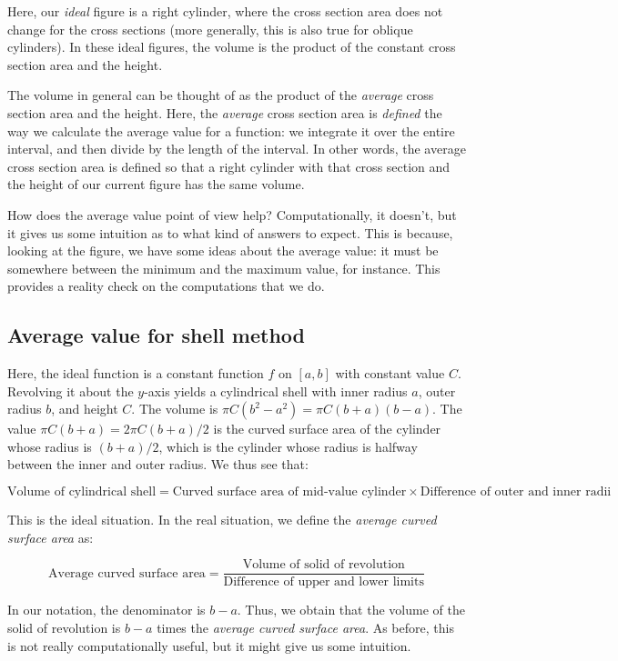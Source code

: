 \documentclass[10pt]{amsart}
\begin{document}
Here, our {\em ideal} figure is a right cylinder, where the cross
section area does not change for the cross sections (more generally,
this is also true for oblique cylinders). In these ideal figures, the
volume is the product of the constant cross section area and the
height.

The volume in general can be thought of as the product of the {\em
average} cross section area and the height. Here, the {\em average}
cross section area is {\em defined} the way we calculate the average
value for a function: we integrate it over the entire interval, and
then divide by the length of the interval. In other words, the average
cross section area is defined so that a right cylinder with that cross
section and the height of our current figure has the same volume.

How does the average value point of view help? Computationally, it
doesn't, but it gives us some intuition as to what kind of answers to
expect. This is because, looking at the figure, we have some ideas
about the average value: it must be somewhere between the minimum and
the maximum value, for instance. This provides a reality check on the
computations that we do.

\subsection{Average value for shell method}

Here, the ideal function is a constant function $f$ on $[a,b]$ with
constant value $C$. Revolving it about the $y$-axis yields a
cylindrical shell with inner radius $a$, outer radius $b$, and height
$C$. The volume is $\pi C(b^2 - a^2) = \pi C(b + a)(b - a)$. The value
$\pi C (b + a) = 2\pi C (b + a)/2$ is the curved surface area of the
cylinder whose radius is $(b + a)/2$, which is the cylinder whose
radius is halfway between the inner and outer radius. We thus see that:

$$\text{Volume of cylindrical shell} = \text{Curved surface area of mid-value cylinder} \times \text{Difference of outer and inner radii}$$

This is the ideal situation. In the real situation, we define the {\em
average curved surface area} as:

$$\text{Average curved surface area} = \frac{\text{Volume of solid of revolution}}{\text{Difference of upper and lower limits}}$$

In our notation, the denominator is $b - a$. Thus, we obtain that the
volume of the solid of revolution is $b - a$ times the {\em average
curved surface area}. As before, this is not really computationally
useful, but it might give us some intuition.
\end{document}

